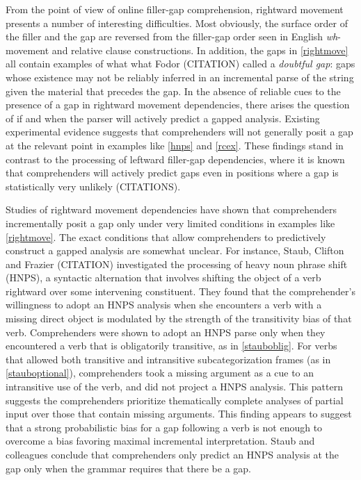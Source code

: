 \documentclass[12pt]{article}
\begin{document}
	From the point of view of online filler-gap comprehension, rightward movement presents a number of interesting difficulties. Most obviously, the surface order of the filler and the gap are reversed from the filler-gap order seen in English \textit{wh}-movement and relative clause constructions. In addition, the gaps in \ref{rightmove} all contain examples of what what Fodor (CITATION) called a \textit{doubtful gap}: gaps whose existence may not be reliably inferred in an incremental parse of the string given the material that precedes the gap. In the absence of reliable cues to the presence of a gap in rightward movement dependencies, there arises the question of if and when the parser will actively predict a gapped analysis. Existing experimental evidence suggests that comprehenders will not generally posit a gap at the relevant point in examples like \ref{hnps} and \ref{rcex}. These findings stand in contrast to the processing of leftward filler-gap dependencies, where it is known that comprehenders will actively predict gaps even in positions where a gap is statistically very unlikely (CITATIONS). 
	
	Studies of rightward movement dependencies have shown that comprehenders incrementally posit a gap only under very limited conditions in examples like \ref{rightmove}. The exact conditions that allow comprehenders to predictively construct a gapped analysis are somewhat unclear. For instance, Staub, Clifton and Frazier (CITATION) investigated the processing of heavy noun phrase shift (HNPS), a syntactic alternation that involves shifting the object of a verb rightward over some intervening constituent. They found that the comprehender's willingness to adopt an HNPS analysis when she encounters a verb with a missing direct object is modulated by the strength of the transitivity bias of that verb. Comprehenders were shown to adopt an HNPS parse only when they encountered a verb that is obligatorily transitive, as in \ref{stauboblig}. For verbs that allowed both transitive and intransitive subcategorization frames (as in \ref{stauboptional}), comprehenders took a missing argument as a cue to an intransitive use of the verb, and did not project a HNPS analysis. This pattern suggests the comprehenders prioritize thematically complete analyses of partial input over those that contain missing arguments. This finding appears to suggest that a strong probabilistic bias for a gap following a verb is not enough to overcome a bias favoring maximal incremental interpretation. Staub and colleagues conclude that comprehenders only predict an HNPS analysis at the gap only when the grammar requires that there be a gap.
\end{document}
